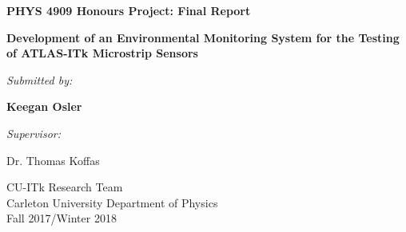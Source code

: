 \documentclass[letterpaper, 11pt]{report}
\begin{document}
\begin{titlepage}
\begin{center}

\begin{spacing}{1.5}
\textbf{PHYS 4909 Honours Project: Final Report}\\
\vspace*{\fill}
\end{spacing}
\begin{spacing}{2.0}
\textbf{\huge Development of an Environmental Monitoring System for the Testing of ATLAS-ITk Microstrip Sensors}\\[0.5cm]
\vspace*{\fill}
\end{spacing}

\begin{spacing}{1.5}
\textit{Submitted by:}

\textbf{\large Keegan Osler}

\vspace*{\fill}
\textit{Supervisor:}

\textnormal{\large Dr. Thomas Koffas}

\vspace*{\fill}

\textnormal{\large CU-ITk Research Team \\ Carleton University Department of Physics \\ Fall 2017/Winter 2018}

\end{spacing}
\end{center}
\end{titlepage}
\end{document}
